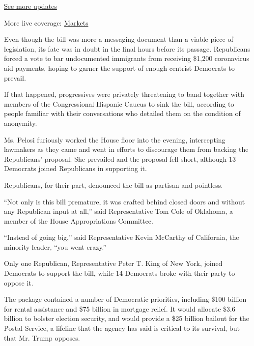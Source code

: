 \href{https://www.nytimes3xbfgragh.onion/2020/09/04/world/covid-19-coronavirus.html?action=click\&pgtype=Article\&state=default\&region=MAIN_CONTENT_1\&context=storylines_live_updates}{See
more updates}

More live coverage:
\href{https://www.nytimes3xbfgragh.onion/live/2020/09/04/business/stock-market-today-coronavirus?action=click\&pgtype=Article\&state=default\&region=MAIN_CONTENT_1\&context=storylines_live_updates}{Markets}

Even though the bill was more a messaging document than a viable piece
of legislation, its fate was in doubt in the final hours before its
passage. Republicans forced a vote to bar undocumented immigrants from
receiving \$1,200 coronavirus aid payments, hoping to garner the support
of enough centrist Democrats to prevail.

If that happened, progressives were privately threatening to band
together with members of the Congressional Hispanic Caucus to sink the
bill, according to people familiar with their conversations who detailed
them on the condition of anonymity.

Ms. Pelosi furiously worked the House floor into the evening,
intercepting lawmakers as they came and went in efforts to discourage
them from backing the Republicans' proposal. She prevailed and the
proposal fell short, although 13 Democrats joined Republicans in
supporting it.

Republicans, for their part, denounced the bill as partisan and
pointless.

``Not only is this bill premature, it was crafted behind closed doors
and without any Republican input at all,'' said Representative Tom Cole
of Oklahoma, a member of the House Appropriations Committee.

``Instead of going big,'' said Representative Kevin McCarthy of
California, the minority leader, ``you went crazy.''

Only one Republican, Representative Peter T. King of New York, joined
Democrats to support the bill, while 14 Democrats broke with their party
to oppose it.

The package contained a number of Democratic priorities, including \$100
billion for rental assistance and \$75 billion in mortgage relief. It
would allocate \$3.6 billion to bolster election security, and would
provide a \$25 billion bailout for the Postal Service, a lifeline that
the agency has said is critical to its survival, but that Mr. Trump
opposes.

